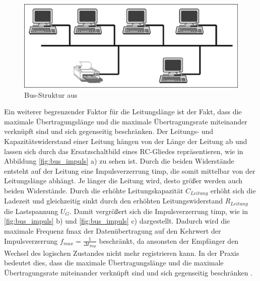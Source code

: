 \begin{figure}
\centering
\includegraphics[width=\textwidth]{abbildungen/20160109_busstruktur}
\caption[Bus-Struktur]{Bus-Struktur aus \cite[S.~3]{schn06}}
\label{fig:bus_struktur}
\end{figure}

Ein weiterer begrenzender Faktor für die Leitungslänge ist der Fakt, dass die maximale Übertragungslänge und die maximale Übertragungsrate miteinander verknüpft sind und sich gegenseitig beschränken.
Der Leitungs- und Kapazitätswiderstand einer Leitung hängen von der Länge der Leitung ab und lassen sich durch das Ersatzschaltbild eines RC-Gliedes repräsentieren, wie in Abbildung \ref{fig:bus_impuls} a) zu sehen ist. Durch die beiden Widerstände entsteht auf der Leitung eine Impulsverzerrung \gls{timp}, die somit mittelbar von der Leitungslänge abhängt.
Je länger die Leitung wird, desto größer werden auch beiden Widerstände. Durch die erhöhte Leitungskapazität $C_{Leitung}$ erhöht sich die Ladezeit und gleichzeitig sinkt durch den erhöhten Leitungswiderstand $R_{Leitung}$ die Lastspannung $U_{G}$. Damit vergrößert sich die Impulsverzerrung \gls{timp}, wie in \ref{fig:bus_impuls} b) und \ref{fig:bus_impuls} c) dargestellt.
Dadurch wird die maximale Frequenz \gls{fmax} der Datenübertragung auf den Kehrwert der Impulsverzerrung $f_{max}=\frac{1}{\Delta t_{Imp}}$ beschränkt, da ansonsten der Empfänger den Wechsel des logischen Zustandes nicht mehr registrieren kann. In der Praxis bedeutet dies, dass die maximale Übertragungslänge und die maximale Übertragungsrate miteinander verknüpft sind und sich gegenseitig beschränken \cite[S.~4f.]{schn06}.

